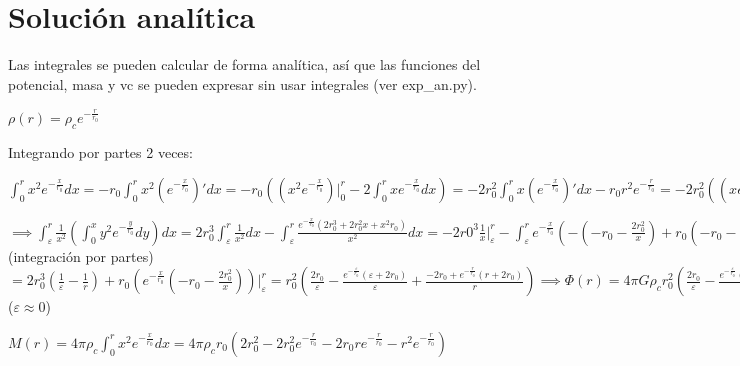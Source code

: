 \documentclass[12pt]{book}
\begin{document}
\section*{Solución analítica}
\begin{description}
\item Las integrales se pueden calcular de forma analítica, así que las funciones del potencial, masa y vc se pueden expresar sin usar integrales (ver exp\_an.py).

\item  $\rho(r) =  \rho_c  e^{-\frac{r}{r_0}} $  
\item Integrando por partes 2 veces:
\item $\int_0^r{x^2 e^{-\frac{x}{r_0}}dx} = - r_0 \int_0^r{x^2 (e^{-\frac{x}{r_0}})\prime dx}
=-r_0( (x^2 e^{-\frac{x}{r_0}})\Big|_0^r  - 2\int_0^r{x e^{-\frac{x}{r_0}}dx})  = 
-2 r_0^2 \int_0^r{x (e^{-\frac{x}{r_0}})\prime dx} - r_0 r^2 e^{-\frac{r}{r_0}} = -2 r_0^2 ((x e^{-\frac{x}{r_0}})\Big|_0^r - \int_0^r{e^{-\frac{x}{r_0}}dx}) - r_0 r^2 e^{-\frac{r}{r_0}} = 
-2 r_0^3 e^{-\frac{x}{r_0}}\Big|_0^r -2 r_0^2 r e^{-\frac{r}{r_0}} - r_0 r^2 e^{-\frac{r}{r_0}} = 
2 r_0^3 -2 r_0^3 e^{-\frac{r}{r_0}} -2 r_0^2 r e^{-\frac{r}{r_0}} - r_0 r^2 e^{-\frac{r}{r_0}}  
= 2  r_0^3 -  r_0 e^{-\frac{r}{r_0}} (2 r_0^2  + 2 r_0 r + r^2)
$

\item $\implies \int_\varepsilon^r{ \frac{1}{x^2}(\int_0^x{y^2 e^{-\frac{y}{r_0}}dy})dx} = 
2 r_0^3 \int_\varepsilon^r{\frac{1}{x^2}dx} - \int_\varepsilon^r{\frac{ e^{-\frac{x}{r_0}} (2 r_0^3 + 2 r_0^2 x +x^2 r_0)}{x^2}dx }=
-2 r0^3 \frac{1}{x}\Big|_\varepsilon^r -  \int_\varepsilon^r{e^{-\frac{x}{r_0}} (- (-r_0 - \frac{2 r_0^2}{x}) + r_0 (-r_0 - \frac{2 r_0^2}{x})\prime) dx } = 
2 r_0^3 (\frac{1}{\varepsilon} - \frac{1}{r}) + r_0 ((e^{-\frac{x}{r_0}})\prime (-r_0 - \frac{2 r_0^2}{x})  + e^{-\frac{x}{r_0}} (-r_0 - \frac{2 r_0^2}{x})\prime )= $(integración por partes)$
=2 r_0^3 (\frac{1}{\varepsilon} - \frac{1}{r}) + r_0 (e^{-\frac{x}{r_0}} (-r_0 - \frac{2 r_0^2}{x})) \Big|_\varepsilon^r =
 r_0^2 (\frac{2 r_0}{\varepsilon} - \frac{e^{-\frac{\varepsilon}{r_0}}(\varepsilon + 2 r_0)  }{\varepsilon} + \frac{-2 r_0 + e^{-\frac{r}{r_0}} (r + 2 r_0) }{r} )
\implies \Phi(r) = 4 \pi G \rho_c r_0^2 (\frac{2 r_0}{\varepsilon} - \frac{e^{-\frac{\varepsilon}{r_0}}(\varepsilon + 2 r_0)  }{\varepsilon}
+ \frac{-2 r_0 + e^{-\frac{r}{r_0}} (r + 2 r_0) }{r} )$ ($\varepsilon \approx 0$)

\item $M(r) = 4 \pi \rho_c \int_0^r{x^2 e^{-\frac{x}{r_0}}dx} = 4 \pi \rho_c r_0 ( 2 r_0^2 - 2 r_0^2 e^{-\frac{r}{r_0}} - 2 r_0 r e^{-\frac{r}{r_0}} - r^2 e^{-\frac{r}{r_0}}) $


\end{description}
\end{document}
